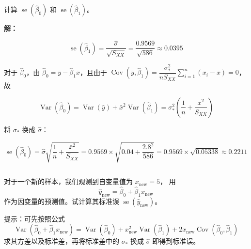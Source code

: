 \documentclass[12pt,a4paper]{article}
\begin{document}
\subsection{}

计算 $\operatorname{se}(\hat{\beta}_0)$ 和
    $\operatorname{se}(\hat{\beta}_1)$。

\begin{answerbox}
\textbf{解：}

$$
\operatorname{se}(\hat{\beta}_1)=\frac{\hat{\sigma}}{\sqrt{S_{XX}}}=\frac{0.9569}{\sqrt{586}}\approx 0.0395
$$

对于 $\hat{\beta}_0$，由 $\hat{\beta}_0=\bar{y}-\hat{\beta}_1\bar{x}$，且由于
$\operatorname{Cov}(\bar{y},\hat{\beta}_1)=\dfrac{\sigma_*^2}{nS_{XX}}\sum_{i=1}^{n}(x_i-\bar{x})=0$，故

$$
\operatorname{Var}(\hat{\beta}_0)=\operatorname{Var}(\bar{y})+\bar{x}^2\operatorname{Var}(\hat{\beta}_1)=\sigma_*^2\left(\frac{1}{n}+\frac{\bar{x}^2}{S_{XX}}\right)
$$

将 $\sigma_*$ 换成 $\hat{\sigma}$：

$$
\operatorname{se}(\hat{\beta}_0)=\hat{\sigma}\sqrt{\frac{1}{n}+\frac{\bar{x}^2}{S_{XX}}}=0.9569\times\sqrt{0.04+\frac{2.8^2}{586}}=0.9569\times\sqrt{0.05338}\approx 0.2211
$$

\end{answerbox}

\subsection{}

对于一个新的样本，我们观测到自变量值为 $x_{\mathrm{new}}=5$，
    用
    \[
      \hat{y}_{\mathrm{new}}
      =\hat{\beta}_0+\hat{\beta}_1x_{\mathrm{new}}
    \]
    作为因变量的预测值。试计算其标准误
    $\operatorname{se}(\hat{y}_{\mathrm{new}})$。

    提示：可先按照公式
    \[
      \operatorname{Var}(\hat{\beta}_0+\hat{\beta}_1x_{\mathrm{new}})
      =\operatorname{Var}(\hat{\beta}_0)
      +x_{\mathrm{new}}^2\operatorname{Var}(\hat{\beta}_1)
      +2x_{\mathrm{new}}\operatorname{Cov}(\hat{\beta}_0,\hat{\beta}_1)
    \]
    求其方差以及标准差，再将标准差中的 $\sigma_*$ 换成 $\hat{\sigma}$
    即得到标准误。
\end{document}
